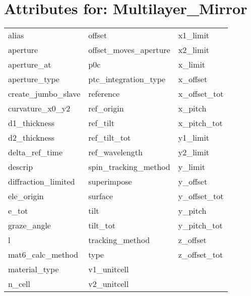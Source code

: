  \section{Attributes for: Multilayer_Mirror}
 \label{s:list.multilayer.mirror}
 
 \begin{tabular}{lll} \toprule
alias                       & offset                      & x1_limit                    \\
aperture                    & offset_moves_aperture       & x2_limit                    \\
aperture_at                 & p0c                         & x_limit                     \\
aperture_type               & ptc_integration_type        & x_offset                    \\
create_jumbo_slave          & reference                   & x_offset_tot                \\
curvature_x0_y2             & ref_origin                  & x_pitch                     \\
d1_thickness                & ref_tilt                    & x_pitch_tot                 \\
d2_thickness                & ref_tilt_tot                & y1_limit                    \\
delta_ref_time              & ref_wavelength              & y2_limit                    \\
descrip                     & spin_tracking_method        & y_limit                     \\
diffraction_limited         & superimpose                 & y_offset                    \\
ele_origin                  & surface                     & y_offset_tot                \\
e_tot                       & tilt                        & y_pitch                     \\
graze_angle                 & tilt_tot                    & y_pitch_tot                 \\
l                           & tracking_method             & z_offset                    \\
mat6_calc_method            & type                        & z_offset_tot                \\
material_type               & v1_unitcell                 &                             \\
n_cell                      & v2_unitcell                 &                             \\
 \bottomrule
 \end{tabular}
 \vfill
 
